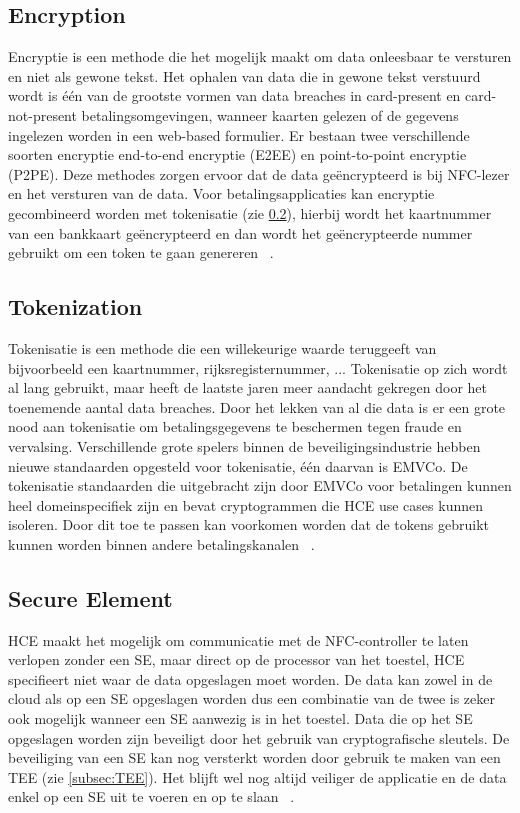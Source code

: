 \subsection{Encryption}
Encryptie is een methode die het mogelijk maakt om data onleesbaar te versturen en niet als gewone tekst. Het ophalen van data die in gewone tekst verstuurd wordt is één van de grootste vormen van data breaches in card-present en card-not-present betalingsomgevingen, wanneer kaarten gelezen of de gegevens ingelezen worden in een web-based formulier. Er bestaan twee verschillende soorten encryptie end-to-end encryptie (E2EE) en point-to-point encryptie (P2PE). Deze methodes zorgen ervoor dat de data geëncrypteerd is bij NFC-lezer en het versturen van de data. Voor betalingsapplicaties kan encryptie gecombineerd worden met tokenisatie (zie \ref{subsec:tok}), hierbij wordt het kaartnummer van een bankkaart geëncrypteerd en dan wordt het geëncrypteerde nummer gebruikt om een token te gaan genereren ~\autocite{SCA2014}.

\subsection{Tokenization}
\label{subsec:tok}
Tokenisatie is een methode die een willekeurige waarde teruggeeft van bijvoorbeeld een kaartnummer, rijksregisternummer, ... Tokenisatie op zich wordt al lang gebruikt, maar heeft de laatste jaren meer aandacht gekregen door het toenemende aantal data breaches. Door het lekken van al die data is er een grote nood aan tokenisatie om betalingsgegevens te beschermen tegen fraude en vervalsing. Verschillende grote spelers binnen de beveiligingsindustrie hebben nieuwe standaarden opgesteld voor tokenisatie, één daarvan is EMVCo. De tokenisatie standaarden die uitgebracht zijn door EMVCo voor betalingen kunnen heel domeinspecifiek zijn en bevat cryptogrammen die HCE use cases kunnen isoleren. Door dit toe te passen kan voorkomen worden dat de tokens gebruikt kunnen worden binnen andere betalingskanalen ~\autocite{SCA2014}.

\subsection{Secure Element}
HCE maakt het mogelijk om communicatie met de NFC-controller te laten verlopen zonder een SE, maar direct op de processor van het toestel, HCE specifieert niet waar de data opgeslagen moet worden. De data kan zowel in de cloud als op een SE opgeslagen worden dus een combinatie van de twee is zeker ook mogelijk wanneer een SE aanwezig is in het toestel. Data die op het SE opgeslagen worden zijn beveiligt door het gebruik van cryptografische sleutels. De beveiliging van een SE kan nog versterkt worden door gebruik te maken van een TEE (zie \ref{subsec:TEE}). Het blijft wel nog altijd veiliger de applicatie en de data enkel op een SE uit te voeren en op te slaan ~\autocite{SCA2014}.


